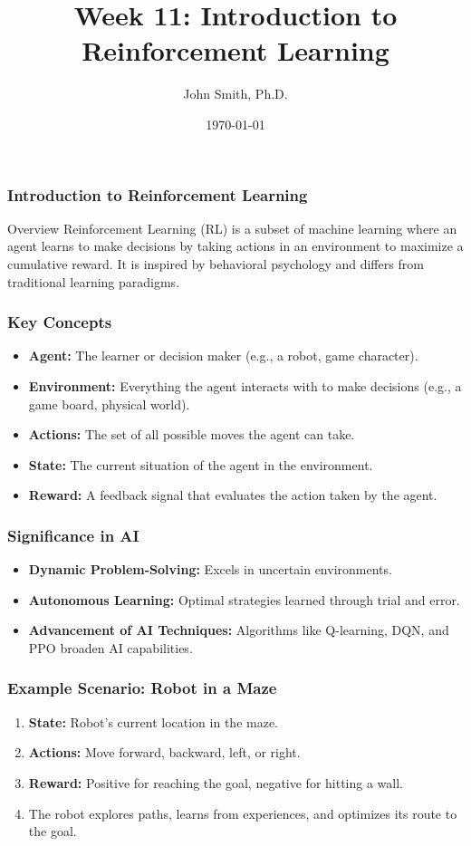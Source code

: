 \documentclass[aspectratio=169]{beamer}
\title{Week 11: Introduction to Reinforcement Learning}
\author[J. Smith]{John Smith, Ph.D.}
\institute[University Name]{
  Department of Computer Science\\
  University Name\\
  \vspace{0.3cm}
  Email: email@university.edu\\
  Website: www.university.edu
}
\date{\today}
\begin{document}
\frame{\titlepage}

\begin{frame}[fragile]
    \frametitle{Introduction to Reinforcement Learning}
    \begin{block}{Overview}
        Reinforcement Learning (RL) is a subset of machine learning where an agent learns to make decisions by taking actions in an environment to maximize a cumulative reward. It is inspired by behavioral psychology and differs from traditional learning paradigms.
    \end{block}
\end{frame}

\begin{frame}[fragile]
    \frametitle{Key Concepts}
    \begin{itemize}
        \item \textbf{Agent:} The learner or decision maker (e.g., a robot, game character).
        \item \textbf{Environment:} Everything the agent interacts with to make decisions (e.g., a game board, physical world).
        \item \textbf{Actions:} The set of all possible moves the agent can take.
        \item \textbf{State:} The current situation of the agent in the environment.
        \item \textbf{Reward:} A feedback signal that evaluates the action taken by the agent.
    \end{itemize}
\end{frame}

\begin{frame}[fragile]
    \frametitle{Significance in AI}
    \begin{itemize}
        \item \textbf{Dynamic Problem-Solving:} Excels in uncertain environments.
        \item \textbf{Autonomous Learning:} Optimal strategies learned through trial and error.
        \item \textbf{Advancement of AI Techniques:} Algorithms like Q-learning, DQN, and PPO broaden AI capabilities.
    \end{itemize}
\end{frame}

\begin{frame}[fragile]
    \frametitle{Example Scenario: Robot in a Maze}
    \begin{enumerate}
        \item \textbf{State:} Robot's current location in the maze.
        \item \textbf{Actions:} Move forward, backward, left, or right.
        \item \textbf{Reward:} Positive for reaching the goal, negative for hitting a wall.
        \item The robot explores paths, learns from experiences, and optimizes its route to the goal.
    \end{enumerate}
\end{frame}
\end{document}
